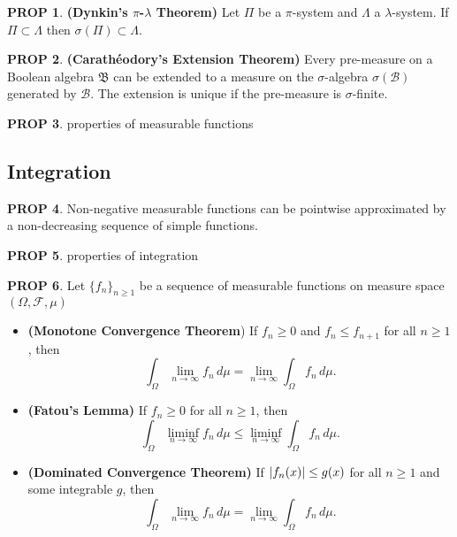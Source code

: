 \documentclass[hidelinks,11pt]{article}
\theoremstyle{definition}
\theoremstyle{dotless}
\newtheorem{prop}{PROP}[section]
\theoremstyle{remark}
\DeclareMathOperator{\1}{\mathbf{1}}
\begin{document}
\begin{prop}\label{Dynkin’sπ-λTheorem}\textup{\textbf{(Dynkin's $\pi$-$\lambda$ Theorem)}} Let $\Pi$ be a $\pi$-system and $\Lambda$ a $\lambda$-system. If $\Pi\subset\Lambda$ then $\sigma(\Pi)\subset\Lambda$.
\end{prop}

\begin{prop}\textup{\textbf{(Carathéodory's Extension Theorem)}} Every pre-measure on a Boolean algebra $\mathfrak{B}$ can be extended to a measure on the $\sigma$-algebra $\sigma(\mathcal{B})$ generated by $\mathcal{B}$. The extension is unique if the pre-measure is $\sigma$-finite.
\end{prop}

\begin{prop}
properties of measurable functions
\end{prop}

\subsection{Integration}

\begin{prop}
Non-negative measurable functions can be pointwise approximated by a non-decreasing sequence of simple functions.
\end{prop}

\begin{prop}
properties of integration
\end{prop}

\begin{prop}
Let $\{f_n\}_{n\geq1}$ be a sequence of measurable functions on measure space $(\Omega,\mathcal{F},\mu)$
\begin{itemize}
    \item \textup{\textbf{(Monotone Convergence Theorem})} If $f_n\geq0$ and $f_n\leq f_{n+1}$ for all $n\geq1$, then \[\int_\Omega\lim_{n\to\infty}f_n\,d\mu=\lim_{n\to\infty}\int_\Omega f_n\,d\mu.\]
    \item \textup{\textbf{(Fatou's Lemma)}} If $f_n\geq0$ for all $n\geq1$, then
    \[\int_\Omega\liminf_{n\to\infty}{f_n}\,d\mu\leq\liminf_{n\to\infty}\int_\Omega f_n\,d\mu.\]
    \item \textup{\textbf{(Dominated Convergence Theorem)}} If $\abs{f_n(x)}\leq g(x)$ for all $n\geq1$ and some integrable $g$, then
    \[\int_\Omega\lim_{n\to\infty}f_n\,d\mu=\lim_{n\to\infty}\int_\Omega f_n\,d\mu.\]
\end{itemize}
\end{prop}
\end{document}
